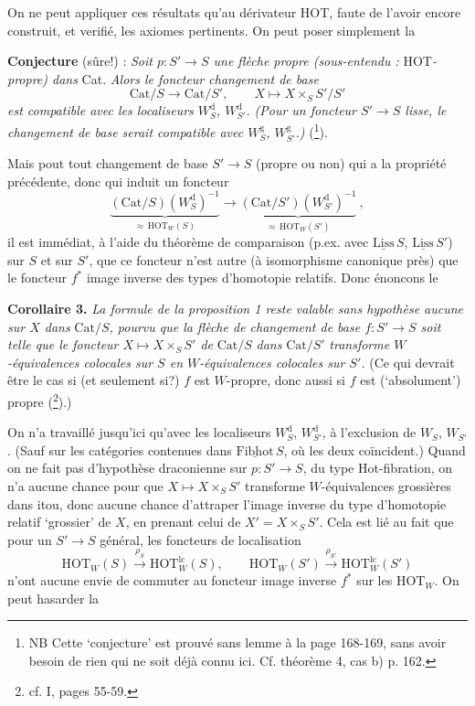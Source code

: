 \documentclass[11pt]{article}
\newcommand{\printedpage}[1]{\marginpar{\footnotesize p.~#1}}
\newcommand{\msp}[1]{\marginpar{\footnotesize [#1]}}
\newcommand{\und}[1]{\underline{\mathrm{#1}}}
\newcommand{\HOT}{\mathrm{HOT}}
\newcommand{\Cat}{\mathrm{Cat}}
\begin{document}
On ne peut appliquer ces résultats qu'au dérivateur
\msp{page 122}
HOT, faute de l'avoir encore construit, et verifié, les axiomes pertinents. On peut poser %
simplement la

\textbf{Conjecture} (sûre!) : \textit{Soit $p : S' \longrightarrow S$ une flèche propre (sous-entendu :} HOT\textit{-propre) dans} Cat. \textit{Alors le foncteur changement de base}
\[
\Cat/S \longrightarrow \Cat/S', \qquad X \longmapsto X \times_S S'/S'
\]
\textit{est compatible avec les localiseurs $W_S^{\mathrm{d}}$, $W_{S'}^{\mathrm{d}}$. (Pour un foncteur $S' \longrightarrow S$ lisse, le changement de base serait compatible avec $W_S^{\mathrm{g}}$, $W_{S'}^{\mathrm{g}}$.)} (\footnote[61]{NB Cette `conjecture' est prouvé sans lemme à la page 168-169, sans avoir besoin de rien qui ne soit %
déjà connu ici. Cf. théorème 4, cas b) p. 162.}).

Mais pout tout changement de base $S' \longrightarrow S$ (propre ou non) qui a la propriété précédente, %
donc qui induit un foncteur
\[
\underbrace{(\Cat/S)(W_S^{\mathrm{d}})^{-1}}_{\approx\,\HOT_W(S)} \longrightarrow \underbrace{(\Cat/S')(W_{S'}^{\mathrm{d}})^{-1}}_{\approx\,\HOT_W(S')}\ ,
\]
\printedpage{76}
il est immédiat, à l'aide du théorème de comparaison (p.ex. avec $\und{Liss}\,S$, $\und{Liss}\,S'$) sur $S$ et sur $S'$, que ce foncteur n'est autre (à isomorphisme canonique près) que le foncteur $f^*$ image inverse des types d'homotopie relatifs. Donc énoncons le %

\textbf{Corollaire 3.} \textit{La formule de la proposition 1 reste valable sans hypothèse aucune sur $X$ dans} $\Cat/S$\textit{, pourvu que la flèche de changement de base $f : S' \longrightarrow S$ soit telle que le foncteur $X \longmapsto X \times_S S'$ de} $\Cat/S$ \textit{dans} $\Cat/S'$
\msp{page 123}
\textit{transforme $W$-équivalences colocales sur $S$ en $W$-équivalences colocales sur $S'$.} (Ce qui devrait être le cas si (et seulement si?) $f$ est $W$-propre, donc aussi si $f$ est (`absolument') propre (\footnote[62]{cf. I, pages 55-59.}).)

On n'a travaillé jusqu'ici qu'avec les localiseurs $W_S^{\mathrm{d}}$, $W_{S'}^{\mathrm{d}}$, à l'exclusion de $W_S$, $W_{S'}$. (Sauf sur les catégories contenues dans $\und{Fibhot}\,S$, où les deux coïncident.) Quand on ne fait pas d'hypothèse draconienne sur $p : S' \longrightarrow S$, du type Hot-fibration, on n'a aucune chance pour que $X \longmapsto X \times_S S'$ transforme $W$-équivalences grossières dans itou, donc aucune chance d'attraper l'image inverse du type d'homotopie relatif `grossier' de $X$, en prenant celui de $X' = X \times_S S'$. Cela est lié au fait que pour un $S' \longrightarrow S$ général, les foncteurs de localisation
\[
\HOT_W(S) \xrightarrow{\rho_S} \HOT_W^{\mathrm{lc}}(S), \qquad \HOT_W(S') \xrightarrow{\rho_{S'}} \HOT_W^{\mathrm{lc}}(S')
\]
n'ont aucune envie de commuter au foncteur image inverse $f^*$ sur les $\HOT_W$. On peut hasarder la
\end{document}
